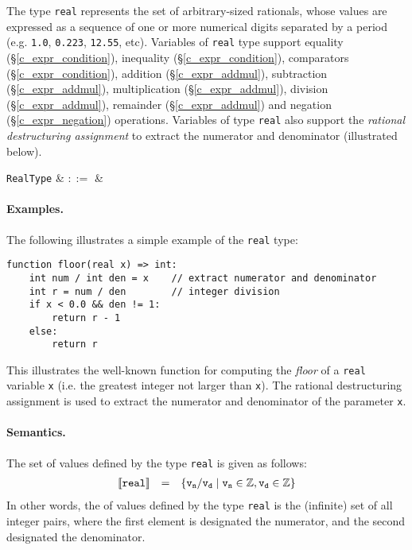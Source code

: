 The type \lstinline{real} represents the set of arbitrary-sized rationals, whose values are expressed as a sequence of one or more numerical digits separated by a period (e.g. \lstinline{1.0}, \lstinline{0.223}, \lstinline{12.55}, etc).  Variables of \lstinline{real} type support equality (\S\ref{c_expr_condition}), inequality (\S\ref{c_expr_condition}), comparators (\S\ref{c_expr_condition}), addition (\S\ref{c_expr_addmul}), subtraction (\S\ref{c_expr_addmul}), multiplication (\S\ref{c_expr_addmul}), division (\S\ref{c_expr_addmul}), remainder (\S\ref{c_expr_addmul}) and negation (\S\ref{c_expr_negation}) operations.  Variables of type \lstinline{real} also support the {\em rational destructuring assignment} to extract the numerator and denominator (illustrated below).

\begin{syntax}
  \verb+RealType+ & $::=$ &  \\
\end{syntax}

\paragraph{Examples.}  The following illustrates a simple example of the \lstinline{real} type:

\begin{lstlisting}
function floor(real x) => int:
    int num / int den = x    // extract numerator and denominator
    int r = num / den        // integer division
    if x < 0.0 && den != 1: 	 
        return r - 1 
    else:
        return r 
\end{lstlisting}
This illustrates the well-known function for computing the {\em floor} of a \lstinline{real} variable \lstinline{x} (i.e. the greatest integer not larger than \lstinline{x}).  The rational destructuring assignment is used to extract the numerator and denominator of the parameter \lstinline{x}.

\paragraph{Semantics.}  The set of values defined by the type \lstinline{real} is given as follows:
\begin{displaymath}
\begin{array}{rcl}
{\tt \llbracket real\rrbracket} & = & {\tt\{ v_n / v_d \;|\;v_n\in\mathbb{Z},v_d\in\mathbb{Z}\}}\\
\end{array}
\end{displaymath}
In other words, the of values defined by the type \lstinline{real} is the (infinite) set of all integer pairs, where the first element is designated the numerator, and the second designated the denominator.

